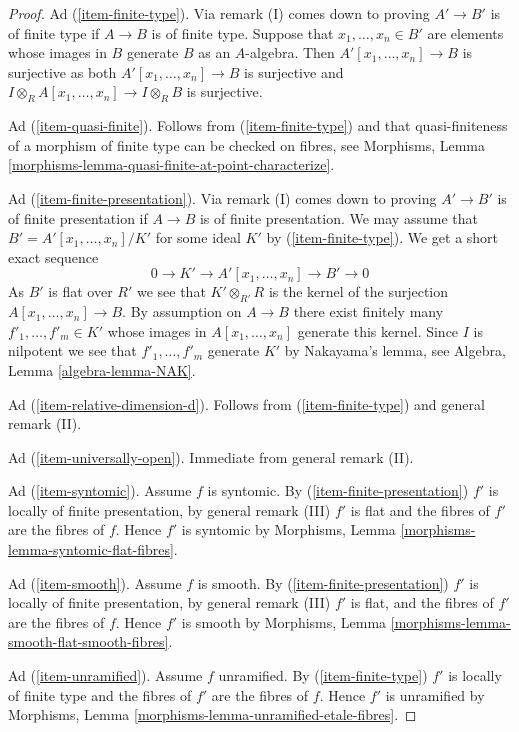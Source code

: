 \begin{proof}
\medskip\noindent
Ad (\ref{item-finite-type}). Via remark (I) comes down to proving $A' \to B'$
is of finite type if $A \to B$ is of finite type. Suppose that
$x_1, \ldots, x_n \in B'$ are elements whose images in $B$ generate $B$
as an $A$-algebra. Then $A'[x_1, \ldots, x_n] \to B$ is surjective
as both $A'[x_1, \ldots, x_n] \to B$ is surjective and
$I \otimes_R A[x_1, \ldots, x_n] \to I \otimes_R B$ is surjective.

\medskip\noindent
Ad (\ref{item-quasi-finite}). Follows from (\ref{item-finite-type}) and that
quasi-finiteness of a morphism of finite type can be checked on fibres, see
Morphisms, Lemma \ref{morphisms-lemma-quasi-finite-at-point-characterize}.

\medskip\noindent
Ad (\ref{item-finite-presentation}). Via remark (I) comes down to proving
$A' \to B'$ is of finite presentation if $A \to B$ is of finite presentation.
We may assume that $B' = A'[x_1, \ldots, x_n]/K'$ for some ideal $K'$ by
(\ref{item-finite-type}). We get a short exact sequence
$$
0 \to K' \to A'[x_1, \ldots, x_n] \to B' \to 0
$$
As $B'$ is flat over $R'$ we see that $K' \otimes_{R'} R$ is the kernel of
the surjection $A[x_1, \ldots, x_n] \to B$. By assumption on $A \to B$ there
exist finitely many $f'_1, \ldots, f'_m \in K'$ whose images in
$A[x_1, \ldots, x_n]$ generate this kernel. Since $I$ is nilpotent we see
that $f'_1, \ldots, f'_m$ generate $K'$ by Nakayama's lemma, see
Algebra, Lemma \ref{algebra-lemma-NAK}.

\medskip\noindent
Ad (\ref{item-relative-dimension-d}). Follows from (\ref{item-finite-type})
and general remark (II).

\medskip\noindent
Ad (\ref{item-universally-open}). Immediate from general remark (II).

\medskip\noindent
Ad (\ref{item-syntomic}). Assume $f$ is syntomic. By
(\ref{item-finite-presentation}) $f'$ is locally of finite presentation,
by general remark (III) $f'$ is flat and the fibres of $f'$ are the fibres
of $f$. Hence $f'$ is syntomic by
Morphisms, Lemma \ref{morphisms-lemma-syntomic-flat-fibres}.

\medskip\noindent
Ad (\ref{item-smooth}). Assume $f$ is smooth. By
(\ref{item-finite-presentation}) $f'$ is locally of finite presentation,
by general remark (III) $f'$ is flat, and the fibres of $f'$ are the
fibres of $f$. Hence $f'$ is smooth by
Morphisms, Lemma \ref{morphisms-lemma-smooth-flat-smooth-fibres}.

\medskip\noindent
Ad (\ref{item-unramified}). Assume $f$ unramified. By
(\ref{item-finite-type}) $f'$ is locally of finite type
and the fibres of $f'$ are the fibres of $f$.
Hence $f'$ is unramified by
Morphisms, Lemma \ref{morphisms-lemma-unramified-etale-fibres}.


\end{proof}
